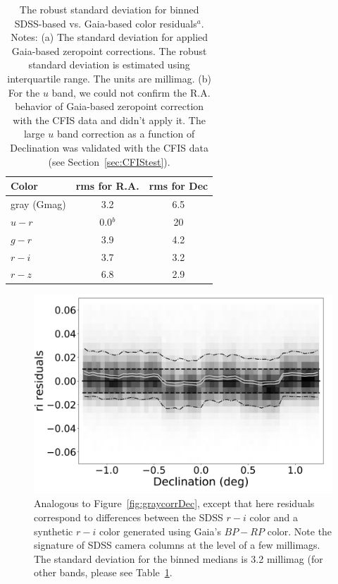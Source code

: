 \documentclass[fleqn,usenatbib]{mnras}
\begin{document}
\begin{table}
	\centering

	\begin{tabular}{l|c|c} %
		\hline
		Color & rms for R.A. & rms for Dec \\
		\hline
 gray (Gmag) &    3.2         &    6.5   \\
    $u-r$        &   0.0$^b$  &   20    \\     
    $g-r$        &   3.9         &    4.2    \\
    $r-i$         &   3.7         &    3.2    \\ 
    $r-z$        &   6.8         &    2.9    \\ 
		\hline
	\end{tabular}
		\caption{The robust standard deviation for binned SDSS-based vs. Gaia-based color residuals$^a$. Notes: (a) The standard deviation for applied Gaia-based zeropoint corrections. The robust standard deviation is estimated using interquartile range. The units are millimag. (b) For the $u$ band, we could not confirm the R.A. behavior of Gaia-based zeropoint correction with the CFIS data and didn't apply it. The large $u$ band correction as a function of Declination was validated with the CFIS data (see Section~\ref{sec:CFIStest}).}
	\label{tab:GaiaRMS}
\end{table}

 

\begin{figure}
    \centering\includegraphics[width=0.9\columnwidth]{figures/colorResidGaiaColorsB_ri_Dec_Hess.png} 
\caption{Analogous to Figure~\ref{fig:graycorrDec}, except that here residuals 
correspond to differences between the SDSS $r-i$ color and a synthetic $r-i$ color
generated using Gaia's $BP-RP$ color. Note the signature of SDSS camera columns
at the level of a few millimags. The standard deviation for the binned medians is 
3.2 millimag (for other bands, please see Table~\ref{tab:GaiaRMS}.}
\label{fig:riresid}
\end{figure}
\end{document}
